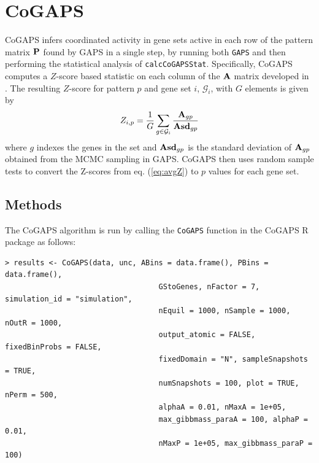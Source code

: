 \documentclass{report}
\begin{document}
\section{CoGAPS} \label{CoGAPSRun}

\par CoGAPS infers coordinated activity in gene sets active in each row of the pattern matrix ${\bf{P}}$ found by GAPS in a single step, by running both \texttt{GAPS} and then performing
the statistical analysis of \texttt{calcCoGAPSStat}.  Specifically, CoGAPS computes a $Z$-score based statistic on each column of the ${\bf{A}}$ matrix developed in \cite{Ochs2009}.  The resulting $Z$-score for pattern $p$ and gene set $i$, $\mathcal{G}_{i}$, with $G$ elements is given by
\begin{equation}
Z_{i,p} = \frac{1}{G} \sum\limits_{g \in \mathcal{G}_{i}} {\frac{{\bf{A}}_{gp}}{{\bf{Asd}}_{gp}}}
\label{eq:avgZ}
\end{equation}
where $g$ indexes the genes in the set and ${\bf{Asd}}_{gp}$ is the standard deviation of ${\bf{A}}_{gp}$ obtained from the MCMC sampling in GAPS.  CoGAPS then uses random sample tests to convert the Z-scores from eq. (\ref{eq:avgZ}) to $p$ values for each gene set.

\subsection{Methods}

\par The CoGAPS algorithm is run by calling the \texttt{CoGAPS} function in the CoGAPS R package as follows:
\begin{verbatim}
> results <- CoGAPS(data, unc, ABins = data.frame(), PBins = data.frame(),
                                   GStoGenes, nFactor = 7, simulation_id = "simulation",
                                   nEquil = 1000, nSample = 1000, nOutR = 1000,
                                   output_atomic = FALSE, fixedBinProbs = FALSE,
                                   fixedDomain = "N", sampleSnapshots = TRUE,
                                   numSnapshots = 100, plot = TRUE, nPerm = 500,
                                   alphaA = 0.01, nMaxA = 1e+05,
                                   max_gibbmass_paraA = 100, alphaP = 0.01,
                                   nMaxP = 1e+05, max_gibbmass_paraP = 100)

\end{verbatim}
\end{document}
